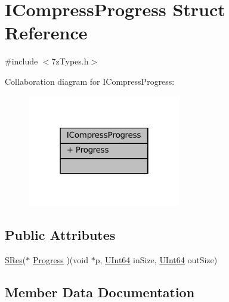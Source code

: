 \hypertarget{struct_i_compress_progress}{}\section{I\+Compress\+Progress Struct Reference}
\label{struct_i_compress_progress}


{\ttfamily \#include $<$7z\+Types.\+h$>$}



Collaboration diagram for I\+Compress\+Progress\+:
\nopagebreak
\begin{figure}[H]
\begin{center}
\leavevmode
\includegraphics[width=190pt]{struct_i_compress_progress__coll__graph}
\end{center}
\end{figure}
\subsection*{Public Attributes}
\begin{DoxyCompactItemize}
\item 
\mbox{\hyperlink{7z_types_8h_acc0053eeb62726b68b22e8c7d9e91367}{S\+Res}}($\ast$ \mbox{\hyperlink{struct_i_compress_progress_afe03b3b6430a3f912bd9becbb152be19}{Progress}} )(void $\ast$p, \mbox{\hyperlink{7z_types_8h_aabaf3d1eda66282f591e56707437c48e}{U\+Int64}} in\+Size, \mbox{\hyperlink{7z_types_8h_aabaf3d1eda66282f591e56707437c48e}{U\+Int64}} out\+Size)
\end{DoxyCompactItemize}


\subsection{Member Data Documentation}
\mbox{\label{struct_i_compress_progress_afe03b3b6430a3f912bd9becbb152be19}} 
